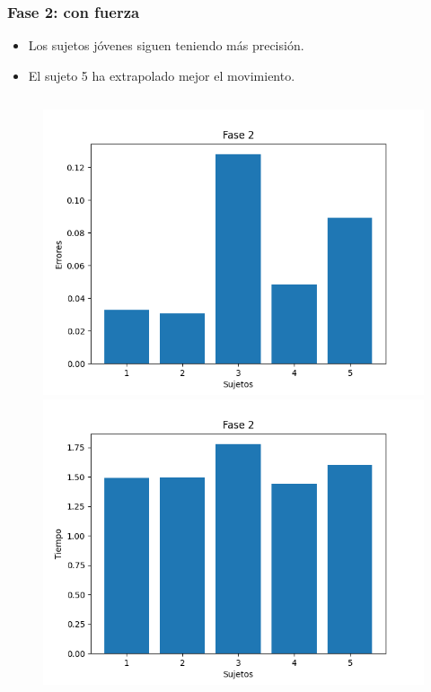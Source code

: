 \documentclass[pdf]{beamer}
\begin{document}
\begin{frame}
	\frametitle{Fase 2: con fuerza}
				\begin{itemize}
		\item Los sujetos jóvenes siguen teniendo más precisión.
		\item El sujeto 5 ha extrapolado mejor el movimiento.
	\end{itemize}
	\begin{columns}
		\begin{column}{0.4\textwidth}
			\begin{figure}
				\includegraphics[width=\textwidth]{fase2-errores}
				\includegraphics[width=\textwidth]{fase2-time}
			\end{figure}
			

\end{column}
\end{columns}
\end{frame}
\end{document}
